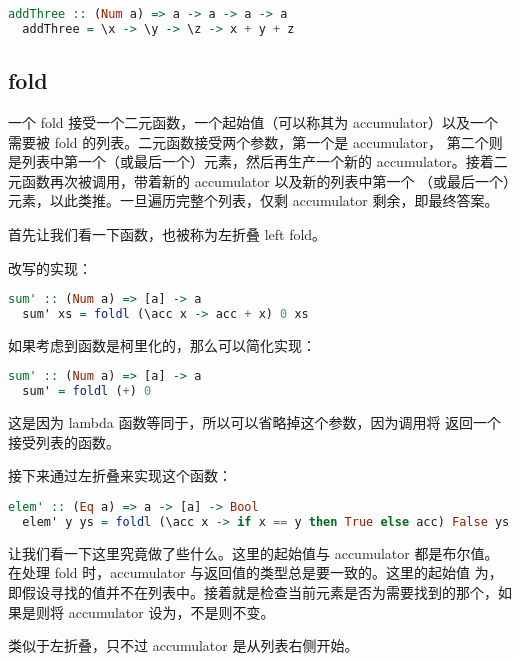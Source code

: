 \documentclass[./main.tex]{subfiles}
\begin{document}
\begin{lstlisting}[language=Haskell]
  addThree :: (Num a) => a -> a -> a -> a
  addThree = \x -> \y -> \z -> x + y + z
\end{lstlisting}

\subsection*{fold}

一个 fold 接受一个二元函数，一个起始值（可以称其为 accumulator）以及一个需要被 fold 的列表。二元函数接受两个参数，第一个是 accumulator，
第二个则是列表中第一个（或最后一个）元素，然后再生产一个新的 accumulator。接着二元函数再次被调用，带着新的 accumulator 以及新的列表中第一个
（或最后一个）元素，以此类推。一旦遍历完整个列表，仅剩 accumulator 剩余，即最终答案。

首先让我们看一下函数，也被称为左折叠 left fold。

改写的实现：

\begin{lstlisting}[language=Haskell]
  sum' :: (Num a) => [a] -> a
  sum' xs = foldl (\acc x -> acc + x) 0 xs
\end{lstlisting}

如果考虑到函数是柯里化的，那么可以简化实现：

\begin{lstlisting}[language=Haskell]
  sum' :: (Num a) => [a] -> a
  sum' = foldl (+) 0
\end{lstlisting}

这是因为 lambda 函数等同于\acode{(+)}，所以可以省略掉这个参数，因为调用将
返回一个接受列表的函数。

接下来通过左折叠来实现这个函数：

\begin{lstlisting}[language=Haskell]
  elem' :: (Eq a) => a -> [a] -> Bool
  elem' y ys = foldl (\acc x -> if x == y then True else acc) False ys
\end{lstlisting}

让我们看一下这里究竟做了些什么。这里的起始值与 accumulator 都是布尔值。在处理 fold 时，accumulator 与返回值的类型总是要一致的。这里的起始值
为，即假设寻找的值并不在列表中。接着就是检查当前元素是否为需要找到的那个，如果是则将 accumulator 设为，不是则不变。

 类似于左折叠，只不过 accumulator 是从列表右侧开始。
\end{document}
